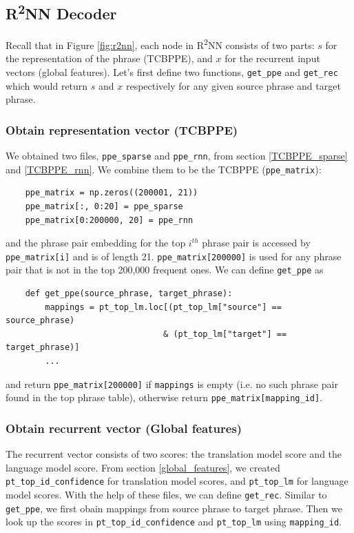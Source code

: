 \documentclass[12pt,a4paper,twoside,openright]{report}
\begin{document}
\subsection{\texorpdfstring{R\textsuperscript{2}NN}{R2NN} Decoder} \label{r2nn_model}
Recall that in Figure \ref{fig:r2nn}, each node in R\textsuperscript{2}NN consists of two parts: $s$ for the representation of the phrase (TCBPPE), and $x$ for the recurrent input vectors (global features). Let's first define two functions, \texttt{get\_ppe} and \texttt{get\_rec} which would return $s$ and $x$ respectively for any given source phrase and target phrase.

\subsubsection{Obtain representation vector (TCBPPE)}
We obtained two files, \texttt{ppe\_sparse} and \texttt{ppe\_rnn}, from section \ref{TCBPPE_sparse} and \ref{TCBPPE_rnn}. We combine them to be the TCBPPE (\texttt{ppe\_matrix}):

\begin{verbatim}
    ppe_matrix = np.zeros((200001, 21))
    ppe_matrix[:, 0:20] = ppe_sparse
    ppe_matrix[0:200000, 20] = ppe_rnn
\end{verbatim}

and the phrase pair embedding for the top $i^{th}$ phrase pair is accessed by \texttt{ppe\_matrix[i]} and is of length 21. \texttt{ppe\_matrix[200000]} is used for any phrase pair that is not in the top 200,000 frequent ones. We can define \texttt{get\_ppe} as

\begin{verbatim}
    def get_ppe(source_phrase, target_phrase):
        mappings = pt_top_lm.loc[(pt_top_lm["source"] == source_phrase) 
                                & (pt_top_lm["target"] == target_phrase)]
        ...
\end{verbatim}

and return \texttt{ppe\_matrix[200000]} if \texttt{mappings} is empty (i.e. no such phrase pair found in the top phrase table), otherwise return \texttt{ppe\_matrix[mapping\_id]}.

\subsubsection{Obtain recurrent vector (Global features)}
The recurrent vector consists of two scores: the translation model score and the language model score. From section \ref{global_features}, we created \texttt{pt\_top\_id\_confidence} for translation model scores, and \texttt{pt\_top\_lm} for language model scores. With the help of these files, we can define \texttt{get\_rec}. Similar to \texttt{get\_ppe}, we first obain mappings from source phrase to target phrase. Then we look up the scores in \texttt{pt\_top\_id\_confidence} and \texttt{pt\_top\_lm} using \texttt{mapping\_id}.
\end{document}
